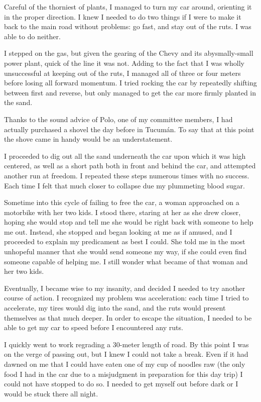 Careful of the thorniest of plants, I managed to turn my car around, orienting it in the proper direction. I knew I needed to do two things if I were to make it back to the main road without problems: go fast, and stay out of the ruts. I was able to do neither.

I stepped on the gas, but given the gearing of the Chevy and its abysmally-small power plant, quick of the line it was not. Adding to the fact that I was wholly unsuccessful at keeping out of the ruts, I managed all of three or four meters before losing all forward momentum. I tried rocking the car by repeatedly shifting between first and reverse, but only managed to get the car more firmly planted in the sand.

Thanks to the sound advice of Polo, one of my committee members, I had actually purchased a shovel the day before in Tucumán. To say that at this point the shove came in handy would be an understatement.

I proceeded to dig out all the sand underneath the car upon which it was high centered, as well as a short path both in front and behind the car, and attempted another run at freedom. I repeated these steps numerous times with no success. Each time I felt that much closer to collapse due my plummeting blood sugar.

Sometime into this cycle of failing to free the car, a woman approached on a motorbike with her two kids. I stood there, staring at her as she drew closer, hoping she would stop and tell me she would be right back with someone to help me out. Instead, she stopped and began looking at me as if amused, and I proceeded to explain my predicament as best I could. She told me in the most unhopeful manner that she would send someone my way, if she could even find someone capable of helping me. I still wonder what became of that woman and her two kids.

Eventually, I became wise to my insanity, and decided I needed to try another course of action. I recognized my problem was acceleration: each time I tried to accelerate, my tires would dig into the sand, and the ruts would present themselves as that much deeper. In order to escape the situation, I needed to be able to get my car to speed before I encountered any ruts.

I quickly went to work regrading a 30-meter length of road. By this point I was on the verge of passing out, but I knew I could not take a break. Even if it had dawned on me that I could have eaten one of my cup of noodles raw (the only food I had in the car due to a misjudgment in preparation for this day trip) I could not have stopped to do so. I needed to get myself out before dark or I would be stuck there all night.

